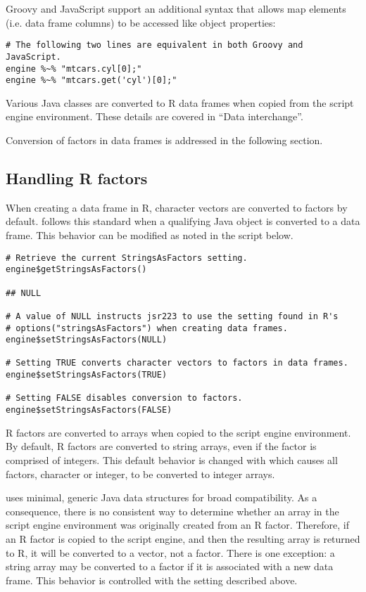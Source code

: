 Groovy and JavaScript support an additional syntax that allows map elements (i.e. data frame columns) to be accessed like object properties:

\begin{verbatim}
# The following two lines are equivalent in both Groovy and JavaScript.
engine %~% "mtcars.cyl[0];"
engine %~% "mtcars.get('cyl')[0];"
\end{verbatim}

Various Java classes are converted to R data frames when copied from the script engine environment. These details are covered in “Data interchange”. 

Conversion of factors in data frames is addressed in the following section.

\subsection{Handling R factors}

When creating a data frame in R, character vectors are converted to factors by default.  follows this standard when a qualifying Java object is converted to a data frame. This behavior can be modified as noted in the script below.

\begin{verbatim}
# Retrieve the current StringsAsFactors setting.
engine$getStringsAsFactors()

## NULL

# A value of NULL instructs jsr223 to use the setting found in R's
# options("stringsAsFactors") when creating data frames.
engine$setStringsAsFactors(NULL)

# Setting TRUE converts character vectors to factors in data frames.
engine$setStringsAsFactors(TRUE)

# Setting FALSE disables conversion to factors.
engine$setStringsAsFactors(FALSE)
\end{verbatim}

R factors are converted to arrays when copied to the script engine environment. By default, R factors are converted to string arrays, even if the factor is comprised of integers. This default behavior is changed with  which causes all factors, character or integer, to be converted to integer arrays.

 uses minimal, generic Java data structures for broad compatibility. As a consequence, there is no consistent way to determine whether an array in the script engine environment was originally created from an R factor. Therefore, if an R factor is copied to the script engine, and then the resulting array is returned to R, it will be converted to a vector, not a factor. There is one exception: a string array may be converted to a factor if it is associated with a new data frame. This behavior is controlled with the  setting described above.

